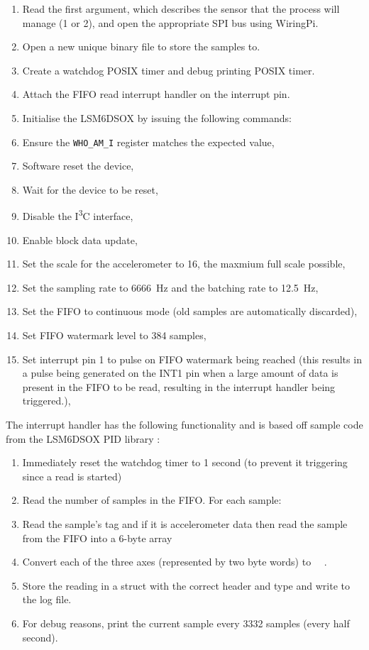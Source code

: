 \documentclass{report}
\begin{document}
\begin{enumerate}
  \item Read the first argument, which describes the sensor that the process will manage (1 or 2), and open the appropriate SPI bus using WiringPi.
  \item Open a new unique binary file to store the samples to.
  \item Create a watchdog POSIX timer and debug printing POSIX timer.
  \item Attach the FIFO read interrupt handler on the interrupt pin.
  \item Initialise the LSM6DSOX by issuing the following commands:
  \item Ensure the \texttt{WHO\_AM\_I} register matches the expected value,
  \item Software reset the device,
  \item Wait for the device to be reset,
  \item Disable the I\textsuperscript{3}C interface,
  \item Enable block data update,
  \item Set the scale for the accelerometer to \SI{16}{\gacc}, the maxmium full scale possible,
  \item Set the sampling rate to \SI{6666}{\hertz} and the batching rate to \SI{12.5}{\hertz},
  \item Set the FIFO to continuous mode (old samples are automatically discarded),
  \item Set FIFO watermark level to 384 samples,
  \item Set interrupt pin 1 to pulse on FIFO watermark being reached (this results in a pulse being generated on the INT1 pin when a large amount of data is present in the FIFO to be read, resulting in the interrupt handler being triggered.),
\end{enumerate}

The interrupt handler has the following functionality and is based off sample code from the LSM6DSOX PID library \cite{stmicroelectronics_lsm6dsox_pid}:

\begin{enumerate}
  \item Immediately reset the watchdog timer to 1 second (to prevent it triggering since a read is started)
  \item Read the number of samples in the FIFO. For each sample:
  \item Read the sample's tag and if it is accelerometer data then read the sample from the FIFO into a 6-byte array
  \item Convert each of the three axes (represented by two byte words) to \SI{}{\milli\gacc}.
  \item Store the reading in a struct with the correct header and type and write to the log file.
  \item For debug reasons, print the current sample every 3332 samples (every half second).
\end{enumerate}
\end{document}
